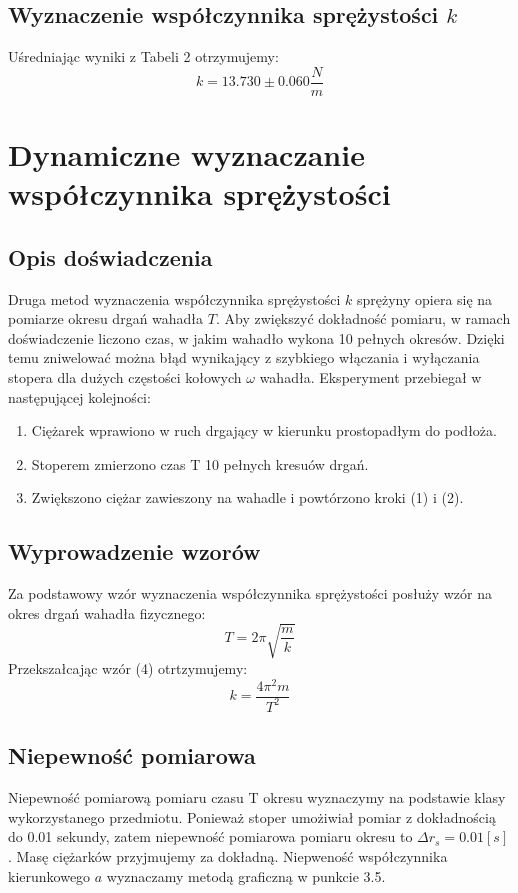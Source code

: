 \documentclass{article} %
\begin{document}
\subsection{Wyznaczenie współczynnika sprężystości $k$}

Uśredniając wyniki z Tabeli 2 otrzymujemy:
{\large
\begin{equation}
    k = 13.730 \pm0.060 \frac{N}{m}
\end{equation}
}

\section{Dynamiczne wyznaczanie współczynnika sprężystości}
\subsection{Opis doświadczenia}
Druga metod wyznaczenia współczynnika sprężystości $k$ sprężyny opiera się na pomiarze okresu drgań wahadła $T$. Aby zwiększyć dokładność pomiaru, w ramach doświadczenie liczono czas, w jakim wahadło wykona 10 pełnych okresów. Dzięki temu zniwelować można błąd wynikający z szybkiego włączania i wyłączania stopera dla dużych częstości kołowych $\omega$ wahadła. Eksperyment przebiegał w następującej kolejności:
\begin{enumerate}
    \item Ciężarek wprawiono w ruch drgający w kierunku prostopadłym do podłoża.
    \item Stoperem zmierzono czas T 10 pełnych kresuów drgań.
    \item Zwiększono ciężar zawieszony na wahadle i powtórzono kroki (1) i (2).
\end{enumerate}
\subsection{Wyprowadzenie wzorów}

Za podstawowy wzór wyznaczenia współczynnika sprężystości posłuży wzór na okres drgań wahadła fizycznego:
{\large
\begin{equation}
    T = 2\pi\sqrt{\frac{m}{k}}
\end{equation}
}
Przekszałcając wzór (4) otrtzymujemy:
{\large
\begin{equation}
    k = \frac{4\pi^2m}{T^2}
\end{equation}
}
\subsection{Niepewność pomiarowa}
Niepewność pomiarową pomiaru czasu T okresu wyznaczymy na podstawie klasy wykorzystanego przedmiotu. Ponieważ stoper umożiwiał pomiar z dokładnością do 0.01 sekundy, zatem niepewność pomiarowa pomiaru okresu to $\Delta r_s = 0.01 [s]$. Masę ciężarków przyjmujemy za dokładną. Niepweność współczynnika kierunkowego $a$ wyznaczamy metodą graficzną w punkcie 3.5. 
\end{document}
